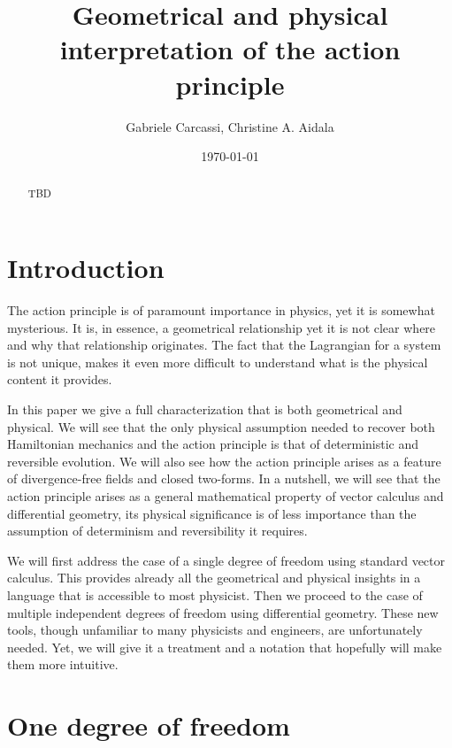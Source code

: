 \documentclass[10pt,twocolumn, nofootinbib]{revtex4-2}
\begin{document}
\title{Geometrical and physical interpretation of the action principle}
\author{Gabriele Carcassi, Christine A. Aidala}

\date{\today}


\begin{abstract}
TBD
\end{abstract}

\maketitle

\section{Introduction}

The action principle is of paramount importance in physics, yet it is somewhat mysterious. It is, in essence, a geometrical relationship yet it is not clear where and why that relationship originates. The fact that the Lagrangian for a system is not unique, makes it even more difficult to understand what is the physical content it provides.

In this paper we give a full characterization that is both geometrical and physical. We will see that the only physical assumption needed to recover both Hamiltonian mechanics and the action principle is that of deterministic and reversible evolution. We will also see how the action principle arises as a feature of divergence-free fields and closed two-forms. In a nutshell, we will see that the action principle arises as a general mathematical property of vector calculus and differential geometry, its physical significance is of less importance than the assumption of determinism and reversibility it requires.

We will first address the case of a single degree of freedom using standard vector calculus. This provides already all the geometrical and physical insights in a language that is accessible to most physicist. Then we proceed to the case of multiple independent degrees of freedom using differential geometry. These new tools, though unfamiliar to many physicists and engineers, are unfortunately needed. Yet, we will give it a treatment and a notation that hopefully will make them more intuitive.

\section{One degree of freedom}
\end{document}
